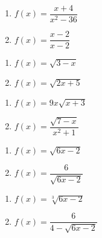 \begin{multicols}{2}
\begin{enumerate}
\setcounter{enumi}{\value{HW}}

\item  $f(x) = \dfrac{x+4}{x^2 - 36}$
\item $f(x) = \dfrac{x-2}{x-2}$  

\setcounter{HW}{\value{enumi}}
\end{enumerate}
\end{multicols}

\begin{multicols}{2}
\begin{enumerate}
\setcounter{enumi}{\value{HW}}

\item  $f(x) = \sqrt{3-x}$
\item $f(x) = \sqrt{2x+5}$  

\setcounter{HW}{\value{enumi}}
\end{enumerate}
\end{multicols}

\begin{multicols}{2}
\begin{enumerate}
\setcounter{enumi}{\value{HW}}

\item  $f(x) = 9x\sqrt{x+3}$
\item $f(x) = \dfrac{\sqrt{7-x}}{x^2+1}$  

\setcounter{HW}{\value{enumi}}
\end{enumerate}
\end{multicols}

\begin{multicols}{2}
\begin{enumerate}
\setcounter{enumi}{\value{HW}}

\item  $f(x) = \sqrt{6x-2}$
\item  $f(x) = \dfrac{6}{\sqrt{6x-2}}$

\setcounter{HW}{\value{enumi}}
\end{enumerate}
\end{multicols}

\begin{multicols}{2}
\begin{enumerate}
\setcounter{enumi}{\value{HW}}

\item  $f(x) = \sqrt[3]{6x-2}$
\item  $f(x) = \dfrac{6}{4 - \sqrt{6x-2}}$

\setcounter{HW}{\value{enumi}}
\end{enumerate}
\end{multicols}

